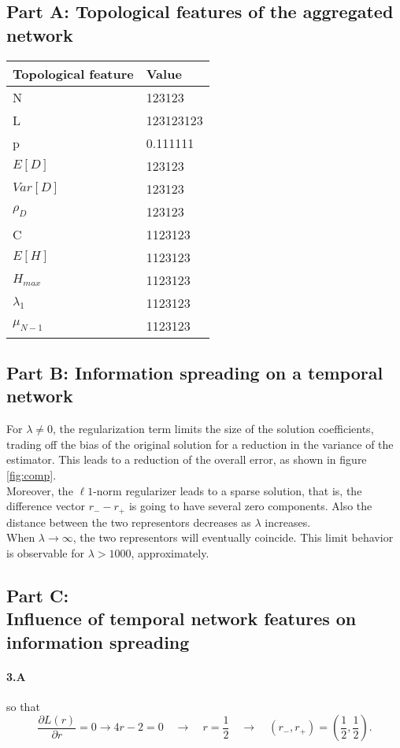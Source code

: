 
\subsection*{Part A: Topological features of the aggregated network}

\setlength\LTleft{0pt} %
\begin{longtable}{@{}l p{}@{}}
\textbf{Topological feature} & \textbf{Value} \\ 
\hline
\endhead
N & 123123 \\
L & 123123123 \\ 
p  & 0.111111 \\ 
$E[D]$  & 123123\\
$Var[D]$ & 123123 \\
$\rho_D$ & 123123\\
C & 1123123\\
$E[H]$ & 1123123\\
$H_{max}$ & 1123123\\
$\lambda_1$ & 1123123\\
$\mu_{N-1}$ & 1123123\\
\end{longtable}

\subsection*{Part B: Information spreading on a temporal network}

For $\lambda \neq 0$, the regularization term limits the size of the solution coefficients, trading off the bias of the original solution for a reduction in the variance of the estimator. 
This leads to a reduction of the overall error, as shown in figure \ref{fig:comp}.\\
Moreover, the $\ell1$-norm regularizer leads to a sparse solution, that is, the difference vector $r_- - r_+$ is going to have several zero components. Also the distance between the two representors decreases as $\lambda$ increases.\\
When $\lambda\rightarrow \infty$, the two representors will eventually coincide. This limit behavior is observable for $\lambda > 1000$, approximately.
\subsection*{Part C: \\Influence of temporal network features on information spreading}
\paragraph{3.A}	
so that
\begin{equation*}
\frac{\partial L(r)}{\partial r}=0 \rightarrow 4r-2 = 0 \quad \rightarrow \quad r = \frac{1}{2} \quad \rightarrow \quad (r_-, r_+) = \left(\frac{1}{2}, \frac{1}{2}\right).
\end{equation*}